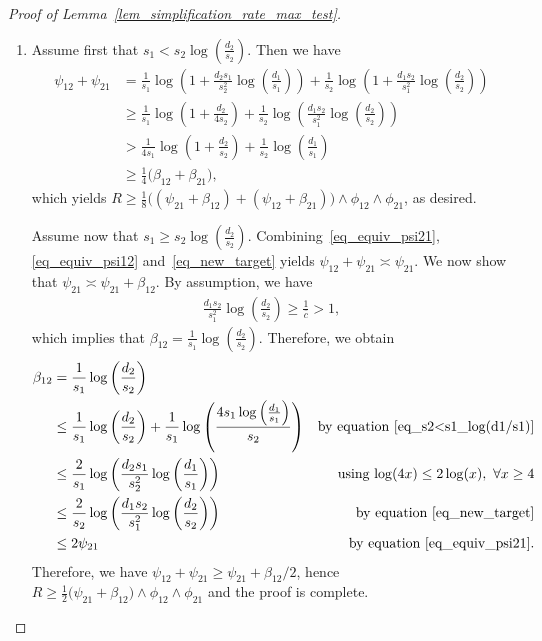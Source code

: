 \documentclass[10pt,a4paper]{amsart}
\begin{document}
\begin{proof}[Proof of Lemma~\ref{lem_simplification_rate_max_test}]
\begin{enumerate}
provided $a_1$ and $a_2$ are larger than suitably large constants, which can be enforced by choosing $c'$ small enough. 
This concludes the proof of the first claim.
\item Assume first that $s_1 < s_2 \log \left(\frac{d_2}{s_2}\right)$. 
Then we have 
    $$\begin{aligned}
    \psi_{12} + \psi_{21}
    & = \frac{1}{s_1} \log\left(1+ \frac{d_2s_1}{s_2^2} \log\left(\frac{d_1}{s_1}\right)\right) + \frac{1}{s_2} \log\left(1+ \frac{d_1s_2}{s_1^2} \log\left(\frac{d_2}{s_2}\right)\right)\\
    & \geq \frac{1}{s_1} \log\left( 1+ \frac{d_2}{4s_2} \right) + \frac{1}{s_2} \log\left(  \frac{d_1s_2}{s_1^2} \log\left(\frac{d_2}{s_2}\right)\right)\\
    & > \frac{1}{4s_1} \log\left( 1+ \frac{d_2}{s_2} \right) + \frac{1}{s_2} \log\left(\frac{d_1}{s_1}\right)\\
    & \geq \frac{1}{4} \big(\beta_{12} + \beta_{21}\big),
\end{aligned}
$$
which yields $R \geq \frac{1}{8} \big((\psi_{21} + \beta_{12}) + (\psi_{12}+\beta_{21})\big) \land \phi_{12} \land \phi_{21}$, as desired. 

Assume now that $s_1 \geq s_2 \log \left(\frac{d_2}{s_2}\right)$. 
Combining~\eqref{eq_equiv_psi21}, \eqref{eq_equiv_psi12} and~\eqref{eq_new_target} yields $\psi_{12} + \psi_{21} \asymp \psi_{21}$. 
We now show that $\psi_{21} \asymp \psi_{21} + \beta_{12}$. 
By assumption, we have
\begin{align*}
    \frac{d_1s_2}{s_1^2} \log\left(\frac{d_2}{s_2}\right)\geq \frac{1}{\bar c} >1,
\end{align*}
which implies that $\beta_{12} = \frac{1}{s_1} \log\left(\frac{d_2}{s_2}\right)$. 
Therefore, we obtain
\begin{align*}
        \beta_{12} & =\frac{1}{s_1} \log\left( \frac{d_2}{s_2} \right) & \\
        & \leq \frac{1}{s_1} \log\left( \frac{d_2}{s_2} \right) + \frac{1}{s_1} \log\left(\frac{4s_1\log\left(\frac{d_1}{s_1}\right)}{s_2}\right) & \text{by equation~\eqref{eq_s2<s1_log(d1/s1)}}\\
        &\leq \frac{2}{s_1} \log\left( \frac{d_2s_1}{s_2^2} \log\left(\frac{d_1}{s_1}\right)\right) & \text{ using $\log(4x) \leq 2 \log(x), ~\forall x\geq 4$}\\
        &\leq \frac{2}{s_2} \log\left( \frac{d_1s_2}{s_1^2} \log\left(\frac{d_2}{s_2}\right)\right) & \text{by equation~\eqref{eq_new_target}}\\
        & \leq 2 \psi_{21} & \text{ by equation~\eqref{eq_equiv_psi21}.}
    \end{align*}
    Therefore, we have $\psi_{12} + \psi_{21} \geq \psi_{21} + \beta_{12}/2$, hence $R \geq \frac{1}{2}\big(\psi_{21} + \beta_{12} \big) \land \phi_{12} \land \phi_{21}$ and the proof is complete.
\end{enumerate}
\end{proof}
\end{document}
